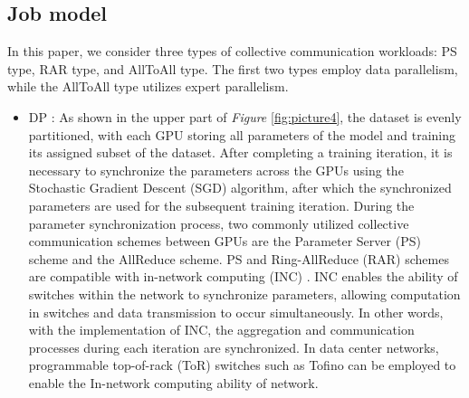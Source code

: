 \documentclass[conference]{IEEEtran}
\begin{document}
\subsection{Job model}

In this paper, we consider three types of collective communication workloads: PS type, RAR type, and AllToAll type. The first two types employ data parallelism, while the AllToAll type utilizes expert parallelism. 

\begin{itemize}
	
	\item DP \cite{Parallelism}: As shown in the upper part of \emph{Figure} \ref{fig:picture4}, the dataset is evenly partitioned, with each GPU storing all parameters of the model and training its assigned subset of the dataset. After completing a training iteration, it is necessary to synchronize the parameters across the GPUs using the Stochastic Gradient Descent (SGD)  \cite{SGD2010} algorithm, after which the synchronized parameters are used for the subsequent training iteration. During the parameter synchronization process, two commonly utilized collective communication schemes between GPUs are the Parameter Server (PS) \cite{PS} scheme and the AllReduce scheme. PS and Ring-AllReduce (RAR) schemes are compatible with in-network computing (INC) \cite{INC2019, Rina}. INC enables the ability of switches within the network to synchronize parameters, allowing computation in switches and data transmission to occur simultaneously. In other words, with the implementation of INC, the aggregation and communication processes during each iteration are synchronized.	In data center networks, programmable top-of-rack (ToR) switches such as Tofino can be employed to enable the In-network computing ability of network.
	

\end{itemize}
\end{document}
